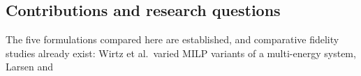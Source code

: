 \documentclass[a4paper,fleqn]{cas-sc}
\begin{document}
\subsection{Contributions and research questions}
The five formulations compared here are established, and comparative fidelity studies
already exist: Wirtz et al.\ varied MILP variants of a multi-energy system, Larsen and
\end{document}
